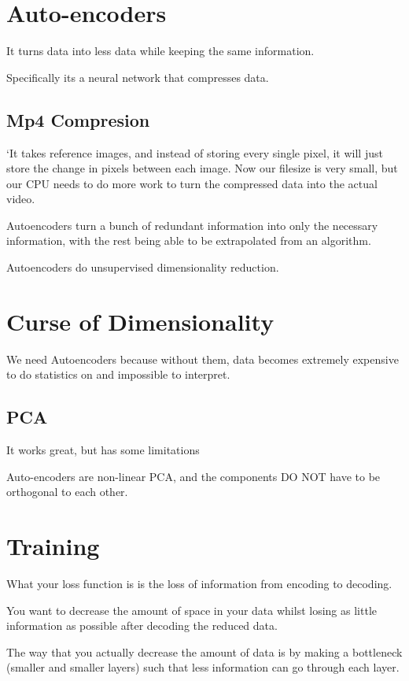\documentclass[fleqn]{report}
\begin{document}
\section{Auto-encoders}
It turns data into less data while keeping the same information.

Specifically its a neural network that compresses data. 

\subsection{Mp4 Compresion}
`It takes reference images, and instead of storing every single pixel, it will 
just store the change in pixels between each image. Now our filesize is 
very small, but our CPU needs to do more work to turn the compressed 
data into the actual video. 

Autoencoders turn a bunch of redundant information into only the necessary 
information, with the rest being able to be extrapolated from an algorithm. 

Autoencoders do unsupervised dimensionality reduction.

\section{Curse of Dimensionality}
We need Autoencoders because without them, data becomes extremely expensive to 
do statistics on and impossible to interpret. 

\subsection{PCA}
It works great, but has some limitations 

Auto-encoders are non-linear PCA, and the components DO NOT have to be 
orthogonal to each other. 

\section{Training}
What your loss function is is the loss of information from encoding to decoding. 

You want to decrease the amount of space in your data whilst losing as little 
information as possible after decoding the reduced data. 

The way that you actually decrease the amount of data is by making a bottleneck
(smaller and smaller layers) such that less information can go through each 
layer. 
\end{document}
